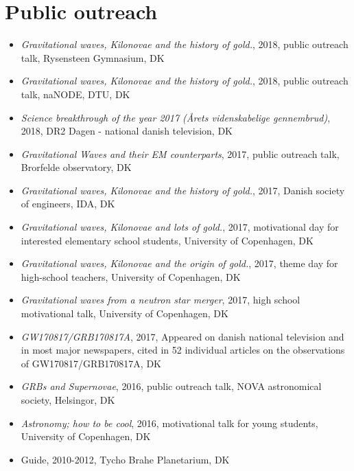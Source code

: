 \documentclass[12pt,letterpaper]{article}
\begin{document}
\section*{Public outreach}

\begin{itemize}
	\item \emph{Gravitational waves, Kilonovae and the history of gold.}, 2018, public outreach talk, Rysensteen Gymnasium, DK
	\item \emph{Gravitational waves, Kilonovae and the history of gold.}, 2018, public outreach talk, naNODE, DTU, DK
    \item \emph{Science breakthrough of the year 2017 (\AA rets videnskabelige gennembrud)}, 2018, DR2 Dagen - national danish television, DK	
    \item \emph{Gravitational Waves and their EM counterparts}, 2017, public outreach talk, Brorfelde observatory, DK
    \item \emph{Gravitational waves, Kilonovae and the history of gold.}, 2017, Danish society of engineers, IDA, DK
    \item \emph{Gravitational waves, Kilonovae and lots of gold.}, 2017, motivational day for interested elementary school students, University of Copenhagen, DK
    \item \emph{Gravitational waves, Kilonovae and the origin of gold.}, 2017, theme day for high-school teachers, University of Copenhagen, DK
    \item \emph{Gravitational waves from a neutron star merger}, 2017, high school motivational talk, University of Copenhagen, DK
    \item \emph{GW170817/GRB170817A}, 2017, Appeared on danish national television and in most major newspapers, cited in 52 individual articles on the observations of GW170817/GRB170817A, DK    
    \item \emph{GRBs and Supernovae}, 2016, public outreach talk, NOVA astronomical society, Helsingor, DK
    \item \emph{Astronomy; how to be cool}, 2016, motivational talk for young students, University of Copenhagen, DK
    
    \item Guide, 2010-2012, Tycho Brahe Planetarium, DK

\end{itemize}
\end{document}
